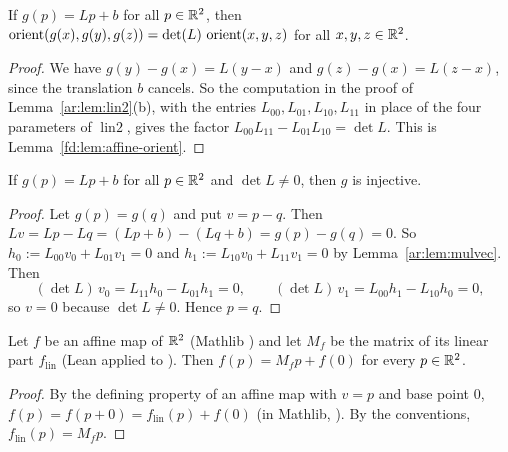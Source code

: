 \begin{lemma}\label{ar:lem:orient-affine}
If $g(p)=Lp+b$ for all $p\in\mathbb R^2$, then $\operatorname{orient}(g(x),g(y),g(z))=\det(L)\,\operatorname{orient}(x,y,z)$ for all $x,y,z\in\mathbb R^2$.
\end{lemma}

\begin{proof}
We have $g(y)-g(x)=L(y-x)$ and $g(z)-g(x)=L(z-x)$, since the translation $b$ cancels. So the computation in the proof
of Lemma~\ref{ar:lem:lin2}(b), with the entries $L_{00},L_{01},L_{10},L_{11}$ in place of the four parameters of
$\operatorname{lin2}$, gives the factor $L_{00}L_{11}-L_{01}L_{10}=\det L$. This is Lemma~\ref{fd:lem:affine-orient}.
\end{proof}

\begin{lemma}\label{ar:lem:inj}
If $g(p)=Lp+b$ for all $p\in\mathbb R^2$ and $\det L\ne0$, then $g$ is injective.
\end{lemma}

\begin{proof}
Let $g(p)=g(q)$ and put $v=p-q$. Then $Lv=Lp-Lq=(Lp+b)-(Lq+b)=g(p)-g(q)=0$. So
$h_0:=L_{00}v_0+L_{01}v_1=0$ and $h_1:=L_{10}v_0+L_{11}v_1=0$ by Lemma~\ref{ar:lem:mulvec}. Then
\[
(\det L)\,v_0=L_{11}h_0-L_{01}h_1=0,\qquad (\det L)\,v_1=L_{00}h_1-L_{10}h_0=0,
\]
so $v=0$ because $\det L\ne0$. Hence $p=q$.
\end{proof}

\begin{lemma}\label{ar:lem:matrix-form}
Let $f$ be an affine map of $\mathbb R^2$ \textup(Mathlib \textup) and let $M_f$ be the matrix of its linear
part $f_{\mathrm{lin}}$ \textup(Lean  applied to \textup). Then $f(p)=M_fp+f(0)$ for every
$p\in\mathbb R^2$.
\end{lemma}

\begin{proof}
By the defining property of an affine map with $v=p$ and base point $0$, $f(p)=f(p+0)=f_{\mathrm{lin}}(p)+f(0)$ (in
Mathlib, ). By the conventions, $f_{\mathrm{lin}}(p)=M_fp$.
\end{proof}

